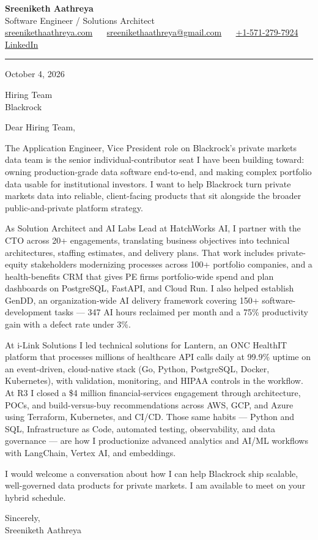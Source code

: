 \documentclass[11pt, letterpaper]{article}
\begin{document}
{\fontsize{18 pt}{20 pt}\selectfont\bfseries Sreeniketh Aathreya}\\[4pt]
Software Engineer / Solutions Architect\\[6pt]
\href{https://sreenikethaathreya.com}{sreenikethaathreya.com}
~\textbullet~
\href{mailto:sreenikethaathreya@gmail.com}{sreenikethaathreya@gmail.com}
~\textbullet~
\href{tel:+1-571-279-7924}{+1-571-279-7924}
~\textbullet~
\href{https://www.linkedin.com/in/sreeniketh-aathreya-16800b122/}{LinkedIn}

\vspace{12pt}
\hrule
\vspace{12pt}

October 4, 2026

\vspace{8pt}

Hiring Team\\
Blackrock

\vspace{12pt}

Dear Hiring Team,

The Application Engineer, Vice President role on Blackrock's private markets data team is the senior individual-contributor seat I have been building toward: owning production-grade data software end-to-end, and making complex portfolio data usable for institutional investors. I want to help Blackrock turn private markets data into reliable, client-facing products that sit alongside the broader public-and-private platform strategy.

As Solution Architect and AI Labs Lead at HatchWorks AI, I partner with the CTO across 20+ engagements, translating business objectives into technical architectures, staffing estimates, and delivery plans. That work includes private-equity stakeholders modernizing processes across 100+ portfolio companies, and a health-benefits CRM that gives PE firms portfolio-wide spend and plan dashboards on PostgreSQL, FastAPI, and Cloud Run. I also helped establish GenDD, an organization-wide AI delivery framework covering 150+ software-development tasks --- 347 AI hours reclaimed per month and a 75\% productivity gain with a defect rate under 3\%.

At i-Link Solutions I led technical solutions for Lantern, an ONC HealthIT platform that processes millions of healthcare API calls daily at 99.9\% uptime on an event-driven, cloud-native stack (Go, Python, PostgreSQL, Docker, Kubernetes), with validation, monitoring, and HIPAA controls in the workflow. At R3 I closed a \$4 million financial-services engagement through architecture, POCs, and build-versus-buy recommendations across AWS, GCP, and Azure using Terraform, Kubernetes, and CI/CD. Those same habits --- Python and SQL, Infrastructure as Code, automated testing, observability, and data governance --- are how I productionize advanced analytics and AI/ML workflows with LangChain, Vertex AI, and embeddings.

I would welcome a conversation about how I can help Blackrock ship scalable, well-governed data products for private markets. I am available to meet on your hybrid schedule.

Sincerely,\\[12pt]
Sreeniketh Aathreya
\end{document}
